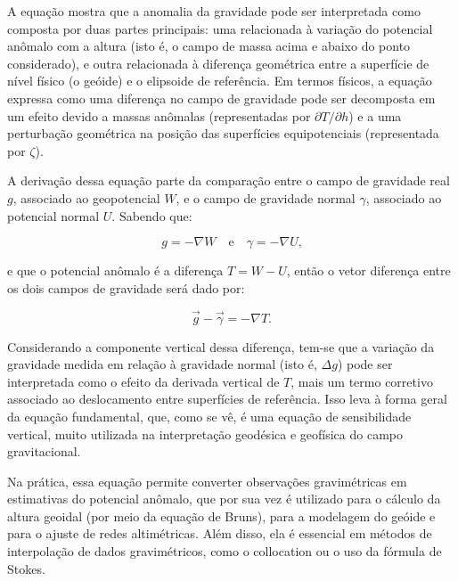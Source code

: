 A equação mostra que a anomalia da gravidade pode ser interpretada como composta por duas partes principais: uma relacionada à variação do potencial anômalo com a altura (isto é, o campo de massa acima e abaixo do ponto considerado), e outra relacionada à diferença geométrica entre a superfície de nível físico (o geóide) e o elipsoide de referência. Em termos físicos, a equação expressa como uma diferença no campo de gravidade pode ser decomposta em um efeito devido a massas anômalas (representadas por \( \partial T/\partial h \)) e a uma perturbação geométrica na posição das superfícies equipotenciais (representada por \( \zeta \)).

A derivação dessa equação parte da comparação entre o campo de gravidade real \( g \), associado ao geopotencial \( W \), e o campo de gravidade normal \( \gamma \), associado ao potencial normal \( U \). Sabendo que:

\[
g = -\nabla W \quad \text{e} \quad \gamma = -\nabla U \text{,}
\]

e que o potencial anômalo é a diferença \( T = W - U \), então o vetor diferença entre os dois campos de gravidade será dado por:

\[
\vec{g} - \vec{\gamma} = -\nabla T \text{.}
\]

Considerando a componente vertical dessa diferença, tem-se que a variação da gravidade medida em relação à gravidade normal (isto é, \( \Delta g \)) pode ser interpretada como o efeito da derivada vertical de \( T \), mais um termo corretivo associado ao deslocamento entre superfícies de referência. Isso leva à forma geral da equação fundamental, que, como se vê, é uma equação de sensibilidade vertical, muito utilizada na interpretação geodésica e geofísica do campo gravitacional.

Na prática, essa equação permite converter observações gravimétricas em estimativas do potencial anômalo, que por sua vez é utilizado para o cálculo da altura geoidal (por meio da equação de Bruns), para a modelagem do geóide e para o ajuste de redes altimétricas. Além disso, ela é essencial em métodos de interpolação de dados gravimétricos, como o collocation ou o uso da fórmula de Stokes.